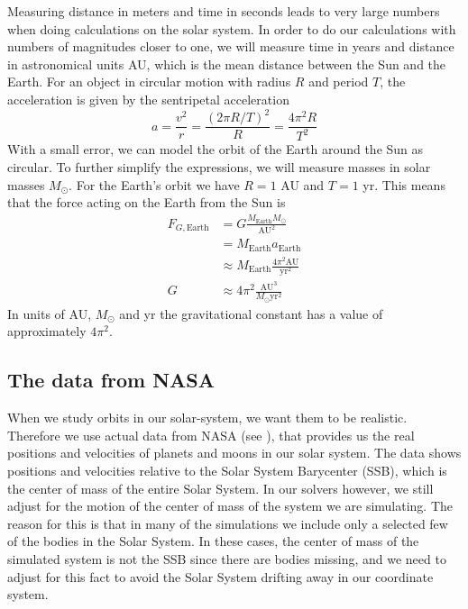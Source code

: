 \documentclass[reprint, english,notitlepage,nofootinbib]{revtex4-1}  %
\begin{document}
Measuring distance in meters and time in seconds leads to very large numbers when doing calculations on the solar system. In order to do our calculations with numbers of magnitudes closer to one, we will measure time in years and distance in astronomical units AU, which is the mean distance between the Sun and the Earth. For an object in circular motion with radius $R$ and period $T$, the acceleration is given by the sentripetal acceleration
\begin{equation*}
  a = \frac{v^2}{r} = \frac{(2 \pi R / T)^2}{R} = \frac{4 \pi^2 R}{T^2}
\end{equation*}
With a small error, we can model the orbit of the Earth around the Sun as circular. To further simplify the expressions, we will measure masses in solar masses $M_\odot$. For the Earth's orbit we have $R = 1$ AU and $T = 1$ yr. This means that the force acting on the Earth from the Sun is
\begin{align*}
  F_{G, \text{Earth}} &= G \frac{M_{\text{Earth}} M_\odot}{\text{AU}^2} \\
  &= M_{\text{Earth}} a_{\text{Earth}} \\
  &\approx M_{\text{Earth}} \frac{4 \pi^2 \text{AU}}{\text{yr}^2} \\
  G &\approx 4 \pi^2 \frac{\text{AU}^3}{M_\odot \text{yr}^2}
\end{align*}
In units of AU, $M_\odot$ and yr the gravitational constant has a value of approximately $4 \pi^2$.


\subsection{The data from NASA}

When we study orbits in our solar-system, we want them to be realistic. Therefore we use actual data from NASA (see \citep{NASA}), that provides us the real positions and velocities of planets and moons in our solar system. The data shows positions and velocities relative to the Solar System Barycenter (SSB), which is the center of mass of the entire Solar System. In our solvers however, we still adjust for the motion of the center of mass of the system we are simulating. The reason for this is that in many of the simulations we include only a selected few of the bodies in the Solar System. In these cases, the center of mass of the simulated system is not the SSB since there are bodies missing, and we need to adjust for this fact to avoid the Solar System drifting away in our coordinate system.
\end{document}
